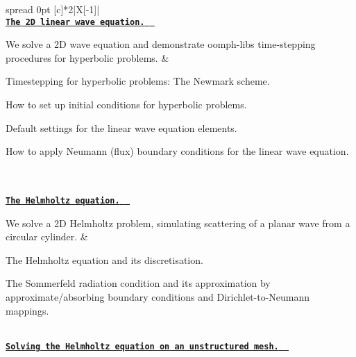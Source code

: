 \begin{longtabu} spread 0pt [c]{*{2}{|X[-1]}|}
\hline
{}\\
\href{../../linear_wave/two_d_linear_wave/html/index.html}{\tt {\bfseries The 2D linear wave equation. } }

We solve a 2D wave equation and demonstrate {\ttfamily oomph-\/lib\textquotesingle{}s} time-\/stepping procedures for hyperbolic problems.  &
\begin{DoxyItemize}
\item Timestepping for hyperbolic problems\+: The Newmark scheme.
\item How to set up initial conditions for hyperbolic problems.
\item Default settings for the linear wave equation elements.
\item How to apply Neumann (flux) boundary conditions for the linear wave equation. 
\end{DoxyItemize}



\\
\\
\href{../../helmholtz/scattering/html/index.html}{\tt {\bfseries The Helmholtz equation. } }

We solve a 2D Helmholtz problem, simulating scattering of a planar wave from a circular cylinder.  &
\begin{DoxyItemize}
\item The Helmholtz equation and its discretisation.
\item The Sommerfeld radiation condition and its approximation by approximate/absorbing boundary conditions and Dirichlet-\/to-\/\+Neumann mappings. 
\end{DoxyItemize}

\\
\href{../../helmholtz/unstructured_scattering/html/index.html}{\tt {\bfseries Solving the Helmholtz equation on an unstructured mesh. } }


\end{longtabu}
